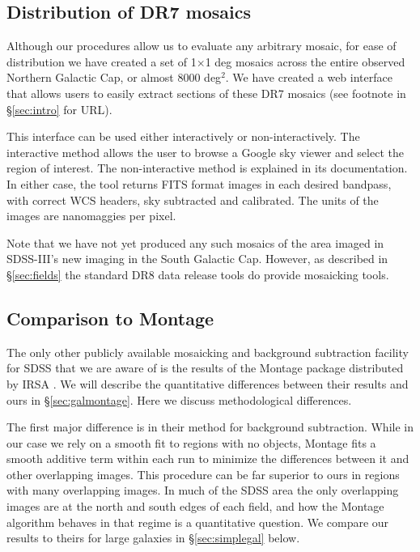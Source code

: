 \documentclass[10pt,preprint]{aastex}
\begin{document}
\subsection{Distribution of DR7 mosaics}
\label{sec:distmosaic}

Although our procedures allow us to evaluate any arbitrary mosaic, for
ease of distribution we have created a set of 1$\times$1 deg mosaics
across the entire observed Northern Galactic Cap, or almost 8000
deg$^2$. We have created a web interface that allows users to easily
extract sections of these DR7 mosaics (see footnote in
\S\ref{sec:intro} for URL).

This interface can be used either interactively or
non-interactively. The interactive method allows the user to browse a
Google sky viewer and select the region of interest.  The
non-interactive method is explained in its documentation.  In either
case, the tool returns FITS format images in each desired bandpass,
with correct WCS headers, sky subtracted and calibrated. The units of
the images are nanomaggies per pixel.

Note that we have not yet produced any such mosaics of the area imaged
in SDSS-III's new imaging in the South Galactic Cap. However, as
described in \S\ref{sec:fields} the standard DR8 data release tools do
provide mosaicking tools.

\subsection{Comparison to Montage}

The only other publicly available mosaicking and background
subtraction facility for SDSS that we are aware of is the results of
the Montage package distributed by IRSA
\citep{berriman03a,berriman04a}. We will describe the quantitative
differences between their results and ours in \S\ref{sec:galmontage}.
Here we discuss methodological differences.

The first major difference is in their method for background
subtraction. While in our case we rely on a smooth fit to regions with
no objects, Montage fits a smooth additive term within each run to
minimize the differences between it and other overlapping images.
This procedure can be far superior to ours in regions with many
overlapping images.  In much of the SDSS area the only overlapping
images are at the north and south edges of each field, and how the
Montage algorithm behaves in that regime is a quantitative
question. We compare our results to theirs for large galaxies in
\S\ref{sec:simplegal} below.
\end{document}
